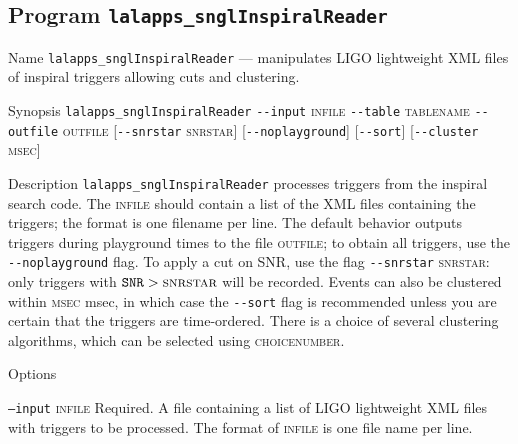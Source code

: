 %
% 
\clearpage
\subsection{Program \texttt{lalapps\_snglInspiralReader}}
\label{program:lalapps-snglInspiralReader}

\begin{entry}
\item[Name]
\verb$lalapps_snglInspiralReader$ --- manipulates LIGO lightweight XML
files of inspiral triggers allowing cuts and clustering.

\item[Synopsis]
\verb$lalapps_snglInspiralReader$ 
\verb$--input$ \textsc{infile} \verb$--table$ \textsc{tablename}
\newline 
\verb$--outfile$ \textsc{outfile}
[\verb$--snrstar$ \textsc{snrstar}] [\verb$--noplayground$] 
[\verb$--sort$] [\verb$--cluster$ \textsc{msec}] 

\item[Description] 
\verb$lalapps_snglInspiralReader$ processes triggers from the inspiral
search code.   The \textsc{infile} should contain a list of the XML
files containing the triggers;  the format is one filename per line. 
The default behavior outputs triggers during playground
times to the file \textsc{outfile};  to obtain all triggers,  use the 
\verb$--noplayground$ flag.    To apply a cut on SNR,  use the flag 
\verb$--snrstar$ \textsc{snrstar}:  only triggers with $\texttt{SNR} 
> \textsc{snrstar}$ will be recorded.    Events can also be clustered
within \textsc{msec} msec,   in which case the \verb$--sort$ flag is
recommended unless you are certain that the triggers are time-ordered.  
There is a choice of several clustering algorithms, which can be selected
using \textsc{choicenumber}.


\item[Options]\leavevmode
\begin{entry}
\item[\texttt{--input} \textsc{infile}] Required.  A file containing a
list of LIGO lightweight XML files with triggers to be processed.  The
format of \textsc{infile} is one file name per line.


\end{entry}
\end{entry}
